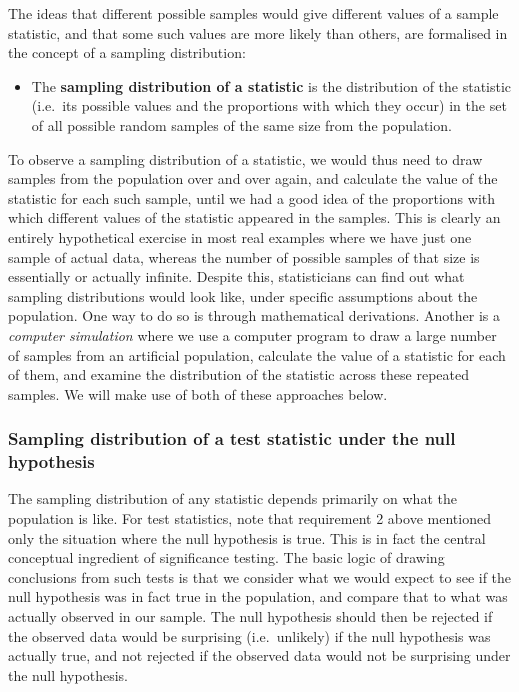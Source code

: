 The ideas that different possible samples would give different values of
a sample statistic, and that some such values are more likely than
others, are formalised in the concept of a sampling distribution:
\begin{itemize}
\item
The \textbf{sampling distribution of a statistic} is the distribution of
the statistic (i.e.\ its possible values and the proportions with which
they occur) in the set of all possible random samples of the same size
from the population.
\end{itemize}
To observe a sampling distribution of a statistic, we would thus need to
draw samples from the population over and over again, and calculate
the value of the statistic for each such sample, until we had a good
idea of the proportions with which different values of the statistic
appeared in the samples. This is clearly an entirely hypothetical
exercise in most real examples where we have just one sample of actual
data, whereas the number of possible samples of that size is essentially
or actually infinite. Despite this, statisticians can find out
what sampling distributions would look like,
under specific assumptions about the population. One way to do so is
through mathematical derivations. Another is a \emph{computer simulation}
where we use a computer program to draw a large number of samples from
an artificial population, calculate the value of a statistic
for each of them, and examine the distribution of the statistic across these
repeated samples. We will make use of both of these approaches below.

\subsubsection{Sampling distribution of a test statistic under the null
hypothesis}

The sampling distribution of any statistic depends primarily on what the
population is like. For test statistics, note that requirement 2 above
mentioned only the situation where the null hypothesis is true. This is
in fact the central conceptual ingredient of significance testing. The
basic logic of drawing conclusions from such tests is that we consider
what we would expect to see if the null hypothesis was in fact true in
the population, and compare that to what was actually observed in our
sample. The null hypothesis should then be rejected if the observed data
would be surprising (i.e.\ unlikely) if the null hypothesis was actually
true, and not rejected if the observed data would not be surprising
under the null hypothesis.

